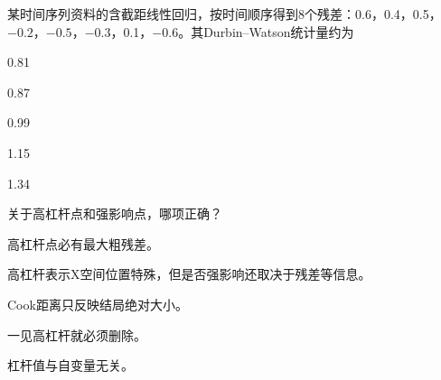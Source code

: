 \par\addvspace{6pt}\noindent\begin{minipage}{\linewidth}


某时间序列资料的含截距线性回归，按时间顺序得到8个残差：0.6，0.4，0.5，\(-0.2\)，\(-0.5\)，\(-0.3\)，0.1，\(-0.6\)。其Durbin--Watson统计量约为

\begin{choices}

\item 0.81

\item 0.87

\item 0.99

\item 1.15

\item 1.34

\end{choices}

\end{minipage}\par\vspace{4pt}

\par\addvspace{6pt}\noindent\begin{minipage}{\linewidth}


关于高杠杆点和强影响点，哪项正确？


\begin{choices}

\item 高杠杆点必有最大粗残差。

\item 高杠杆表示X空间位置特殊，但是否强影响还取决于残差等信息。

\item Cook距离只反映结局绝对大小。

\item 一见高杠杆就必须删除。

\item 杠杆值与自变量无关。

\end{choices}

\end{minipage}\par\vspace{4pt}

